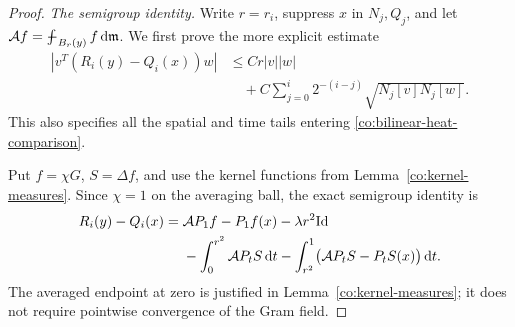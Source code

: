 \begin{proof}
\emph{The semigroup identity.}
Write \(r=r_i\), suppress \(x\) in \(N_j,Q_j\), and let
\(\mathcal A f=\fint_{B_r(y)}f\dd\m\).  We first prove the more
explicit estimate
\begin{equation}\label{co:raw-bilinear-heat}
 \begin{split}
 |v^T(R_i(y)-Q_i(x))w|
 &\le Cr|v||w|\\
 &\quad+C\sum_{j=0}^i2^{-(i-j)}
                   \sqrt{N_j[v]N_j[w]}.
 \end{split}
\end{equation}
This also specifies all the spatial and time tails entering
\eqref{co:bilinear-heat-comparison}.

Put \(f=\chi G\), \(S=\Delta f\), and use the kernel functions
from Lemma~\ref{co:kernel-measures}.  Since \(\chi=1\) on the
averaging ball, the exact semigroup identity is
\begin{equation}\label{co:average-heat-identity}
 \begin{split}
 R_i(y)-Q_i(x)
 ={}&\mathcal A P_1f-P_1f(x)-\lambda r^2\mathrm{Id}\\
 &-\int_0^{r^2}\mathcal A P_tS\,\mathrm d t
  -\int_{r^2}^1\bigl(\mathcal A P_tS-P_tS(x)\bigr)\,\mathrm d t.
 \end{split}
\end{equation}
The averaged endpoint at zero is justified in
Lemma~\ref{co:kernel-measures}; it does not require pointwise
convergence of the Gram field.


\end{proof}
